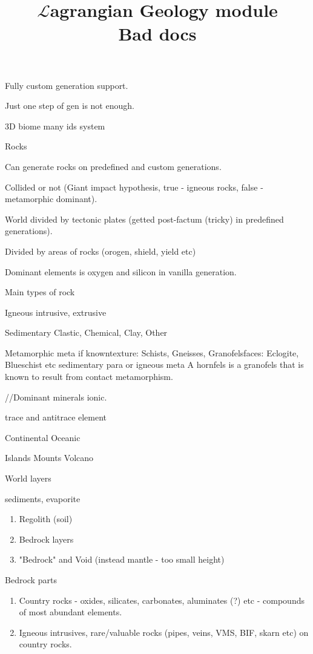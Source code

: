 \documentclass[12pt]{article}
\title{$\mathcal{L}$agrangian Geology module \\ Bad docs}
\begin{document}
    \maketitle

    Fully custom generation support.

    Just one step of gen is not enough.

    3D biome many ids system

    Rocks

    Can generate rocks on predefined and custom generations.  

    Collided or not (Giant impact hypothesis, true - igneous rocks, false - metamorphic dominant).

    World divided by tectonic plates (getted post-factum (tricky) in predefined generations).

    Divided by areas of rocks (orogen, shield, yield etc)

    Dominant elements is oxygen and silicon in vanilla generation.

    Main types of rock

    Igneous {intrusive, extrusive}

    Sedimentary {Clastic, Chemical, Clay, Other}

    Metamorphic {meta if known}{texture: Schists, Gneisses, Granofels}{faces: Eclogite, Blueschist etc}
    {sedimentary para or igneous meta}
    A hornfels is a granofels that is known to result from contact metamorphism.

    //Dominant minerals ionic.

    trace and antitrace element

    Continental
    Oceanic

    Islands
    Mounts
    Volcano


    World layers

    sediments, evaporite

    \begin{enumerate}
        \item Regolith (soil)
        \item Bedrock layers
        \item "Bedrock" and Void (instead mantle - too small height)
    \end{enumerate}

    Bedrock parts

    \begin{enumerate}
        \item Country rocks - oxides, silicates, carbonates, aluminates (?) etc - compounds of most abundant elements.
        \item Igneous intrusives, rare/valuable rocks (pipes, veins, VMS, BIF, skarn etc) on country rocks.
    \end{enumerate}
\end{document}
